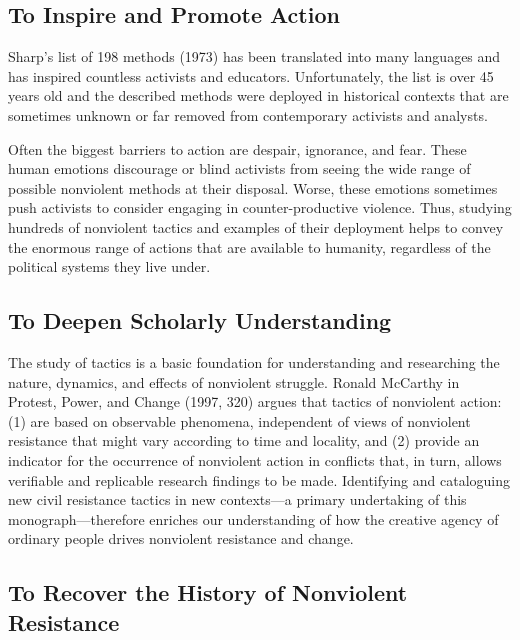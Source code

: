 \documentclass[twoside,a4paper,12pt,fleqn,openany]{extbook}
\begin{document}
\subsection*{To Inspire and Promote Action}

Sharp’s list of 198 methods (1973) has been translated into many languages and has inspired
countless activists and educators. Unfortunately, the list is over 45 years old and the described methods were deployed in historical contexts that are sometimes unknown or far removed from contemporary activists and analysts.

Often the biggest barriers to action are despair, ignorance, and fear. These human emotions discourage or blind activists from seeing the wide range of possible nonviolent methods at their disposal. Worse, these emotions sometimes push activists to consider engaging in counter-productive violence. Thus, studying hundreds of nonviolent tactics and examples of their deployment helps to convey the enormous range of actions that are available to humanity, regardless of the political systems they live under.

\subsection*{To Deepen Scholarly Understanding}

The study of tactics is a basic foundation for understanding and researching the nature,
dynamics, and effects of nonviolent struggle. Ronald McCarthy in Protest, Power, and Change
(1997, 320) argues that tactics of nonviolent action: (1) are based on observable phenomena,
independent of views of nonviolent resistance that might vary according to time and locality,
and (2) provide an indicator for the occurrence of nonviolent action in conflicts that, in turn, allows verifiable and replicable research findings to be made. Identifying and cataloguing new civil resistance tactics in new contexts—a primary undertaking of this monograph—therefore enriches our understanding of how the creative agency of ordinary people drives nonviolent resistance and change.

\subsection*{To Recover the History of Nonviolent Resistance}
\end{document}
